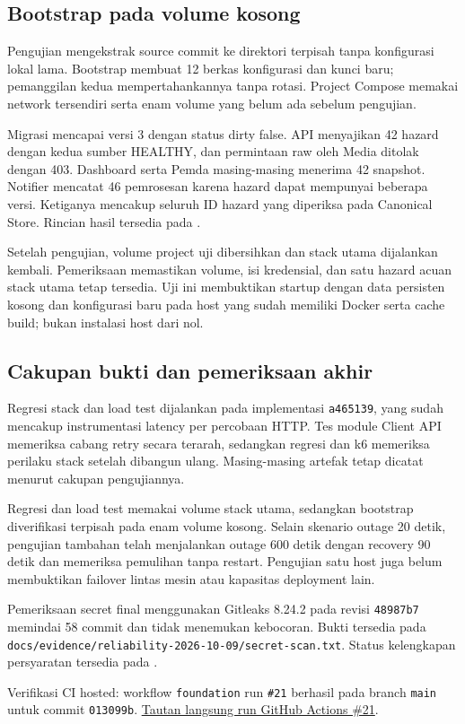 \subsection{Bootstrap pada volume kosong}
Pengujian mengekstrak source commit ke direktori terpisah tanpa konfigurasi lokal lama. Bootstrap membuat 12 berkas konfigurasi dan kunci baru; pemanggilan kedua mempertahankannya tanpa rotasi. Project Compose memakai network tersendiri serta enam volume yang belum ada sebelum pengujian.

Migrasi mencapai versi 3 dengan status dirty false. API menyajikan 42 hazard dengan kedua sumber HEALTHY, dan permintaan raw oleh Media ditolak dengan 403. Dashboard serta Pemda masing-masing menerima 42 snapshot. Notifier mencatat 46 pemrosesan karena hazard dapat mempunyai beberapa versi. Ketiganya mencakup seluruh ID hazard yang diperiksa pada Canonical Store. Rincian hasil tersedia pada .

Setelah pengujian, volume project uji dibersihkan dan stack utama dijalankan kembali. Pemeriksaan memastikan volume, isi kredensial, dan satu hazard acuan stack utama tetap tersedia. Uji ini membuktikan startup dengan data persisten kosong dan konfigurasi baru pada host yang sudah memiliki Docker serta cache build; bukan instalasi host dari nol.

\subsection{Cakupan bukti dan pemeriksaan akhir}
Regresi stack dan load test dijalankan pada implementasi \texttt{a465139}, yang sudah mencakup instrumentasi latency per percobaan HTTP. Tes module Client API memeriksa cabang retry secara terarah, sedangkan regresi dan k6 memeriksa perilaku stack setelah dibangun ulang. Masing-masing artefak tetap dicatat menurut cakupan pengujiannya.

Regresi dan load test memakai volume stack utama, sedangkan bootstrap diverifikasi terpisah pada enam volume kosong. Selain skenario outage 20 detik, pengujian tambahan telah menjalankan outage 600 detik dengan recovery 90 detik dan memeriksa pemulihan tanpa restart. Pengujian satu host juga belum membuktikan failover lintas mesin atau kapasitas deployment lain.

Pemeriksaan secret final menggunakan Gitleaks 8.24.2 pada revisi \texttt{48987b7} memindai 58 commit dan tidak menemukan kebocoran. Bukti tersedia pada \nolinkurl{docs/evidence/reliability-2026-10-09/secret-scan.txt}. Status kelengkapan persyaratan tersedia pada .

Verifikasi CI hosted: workflow \texttt{foundation} run \texttt{\#21} berhasil pada branch \texttt{main} untuk commit \texttt{013099b}. \href{https://github.com/WwzFwz/AkuAnakTehat/actions/runs/37832513217}{Tautan langsung run GitHub Actions \#21}.
